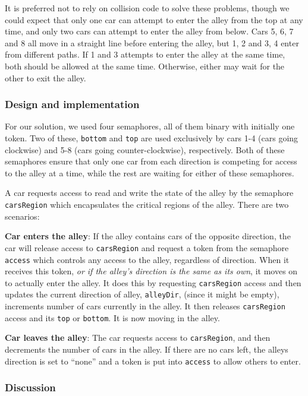 It is preferred not to rely on collision code to solve these problems, though we could expect that only one car can attempt to enter the alley from the top at any time, and only two cars can attempt to enter the alley from below. Cars 5, 6, 7 and 8 all move in a straight line before entering the alley, but 1, 2 and 3, 4 enter from different paths. If 1 and 3 attempts to enter the alley at the same time, both should be allowed at the same time. Otherwise, either may wait for the other to exit the alley.

\subsubsection{Design and implementation}
For our solution, we used four semaphores, all of them binary with initially one token. Two of these, \texttt{bottom} and \texttt{top} are used exclusively by cars 1-4 (cars going clockwise) and 5-8 (cars going counter-clockwise), respectively. Both of these semaphores ensure that only one car from each direction is competing for access to the alley at a time, while the rest are waiting for either of these semaphores.

A car requests access to read and write the state of the alley by the semaphore \texttt{carsRegion} which encapsulates the critical regions of the alley. There are two scenarios:

\textbf{Car enters the alley}: If the alley contains cars of the opposite direction, the car will release access to \texttt{carsRegion} and request a token from the semaphore \texttt{access} which controls any access to the alley, regardless of direction. When it receives this token, \emph{or if the alley's direction is the same as its own}, it moves on to actually enter the alley. It does this by requesting \texttt{carsRegion} access and then updates the current direction of alley, \texttt{alleyDir}, (since it might be empty), increments number of cars currently in the alley. It then releases \texttt{carsRegion} access and its \texttt{top} or \texttt{bottom}. It is now moving in the alley.

\textbf{Car leaves the alley}: The car requests access to \texttt{carsRegion}, and then decrements the number of cars in the alley. If there are no cars left, the alleys direction is set to ``none'' and a token is put into \texttt{access} to allow others to enter.

\subsubsection{Discussion}

